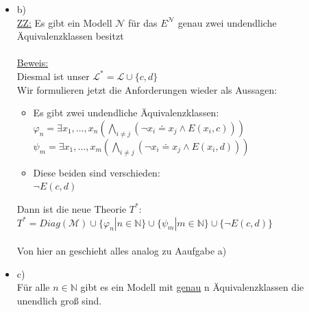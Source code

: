 \documentclass[a4paper]{scrartcl}
\begin{document}
\begin{itemize}
        \item b)\\
            \underline{ZZ:} Es gibt ein Modell $\mathcal{N}$ für das $E^\mathcal{N}$ genau zwei undendliche Äquivalenzklassen besitzt\\
            \\\underline{Beweis:}\\ 
                Diesmal ist unser $\mathscr{L}^* = \mathscr{L} \cup \{c,d\}$\\
                Wir formulieren jetzt die Anforderungen wieder als Aussagen:\\
                \begin{itemize}
                    \item Es gibt zwei undendliche Äquivalenzklassen:\\
                        $\varphi_n = \exists x_1,\dots,x_n(\bigwedge_{i \neq j} (\neg x_i \doteq x_j \land E(x_i,c)))$\\
                        $\psi_m = \exists x_1,\dots,x_m (\bigwedge_{i \neq j} (\neg x_i \doteq x_j \land E(x_i,d)))$\\
                    \item Diese beiden sind verschieden:\\
                        $\neg E(c,d)$\\
                \end{itemize}
                Dann ist die neue Theorie $T^*:$\\
                $T^* = Diag(\mathcal{M}) \cup \{\varphi_n | n \in \mathds{N}\} \cup \{\psi_m | m \in \mathds{N}\} \cup \{\neg E(c,d)\}$\\
                \\Von hier an geschieht alles analog zu Aaufgabe a)\\

        \item c)\\
            Für alle $n \in \mathds{N}$ gibt es ein Modell mit \underline{genau} n Äquivalenzklassen die unendlich groß sind.\\



    \end{itemize}

\newpage

\section*{}%
\label{sec:aufgabe_4}
\end{document}
